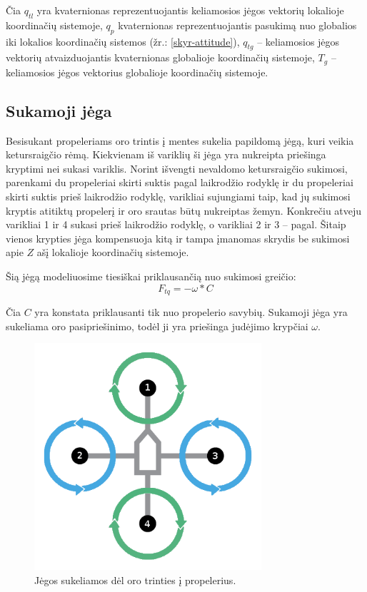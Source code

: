 \documentclass[12pt, a4paper, lithuanian, final]{article}
\begin{document}
Čia $q_{tl}$ yra kvaternionas reprezentuojantis keliamosios jėgos vektorių lokalioje koordinačių sistemoje, $q_{p}$ kvaternionas reprezentuojantis pasukimą nuo globalios iki lokalios koordinačių sistemos (žr.: \ref{skyr-attitude}), $q_{tg}$ -- keliamosios jėgos vektorių atvaizduojantis kvaternionas globalioje koordinačių sistemoje, $T_g$ -- keliamosios jėgos vektorius globalioje koordinačių sistemoje.





\subsection{Sukamoji jėga}

Besisukant propeleriams oro trintis į mentes sukelia papildomą jėgą, kuri veikia ketursraigčio rėmą.
Kiekvienam iš variklių ši jėga yra nukreipta priešinga kryptimi nei sukasi variklis.
Norint išvengti nevaldomo ketursraigčio sukimosi, parenkami du propeleriai skirti suktis pagal laikrodžio rodyklę ir du propeleriai skirti suktis prieš laikrodžio rodyklę, varikliai sujungiami taip, kad jų sukimosi kryptis atitiktų propelerį ir oro srautas būtų nukreiptas žemyn.
Konkrečiu atveju varikliai 1 ir 4 sukasi prieš laikrodžio rodyklę, o varikliai 2 ir 3 -- pagal.
Šitaip vienos krypties jėga kompensuoja kitą ir tampa įmanomas skrydis be sukimosi apie $Z$ ašį lokalioje koordinačių sistemoje.

Šią jėgą modeliuosime tiesiškai priklausančią nuo sukimosi greičio:
\begin{equation}
	F_{tq} = -\omega * C
\end{equation}

Čia $C$ yra konstata priklausanti tik nuo propelerio savybių. Sukamoji jėga yra sukeliama oro pasipriešinimo, todėl ji yra priešinga judėjimo krypčiai $\omega$.


\begin{figure}[H]
\begin{center}
\includegraphics[width=0.75\textwidth]{img/quadcopter-torque.png}
\caption{Jėgos sukeliamos dėl oro trinties į propelerius.}
\end{center}
\end{figure}
\end{document}
